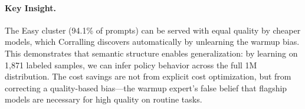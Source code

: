 \paragraph{Key Insight.}
The Easy cluster (94.1\% of prompts) can be served with equal quality by cheaper models, which Corralling discovers automatically by unlearning the warmup bias.
This demonstrates that semantic structure enables generalization: by learning on 1,871 labeled samples, we can infer policy behavior across the full 1M distribution.
The cost savings are not from explicit cost optimization, but from correcting a quality-based bias---the warmup expert's false belief that flagship models are necessary for high quality on routine tasks.





